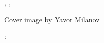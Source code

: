 \thispagestyle{empty}

\hfill

\vfill

\noindent\myName, \textit{\myTitle,} %
\myTime

\noindent Cover image by Yavor Milanov

\noindent{}: \myDOI

%
%
%
%
%

